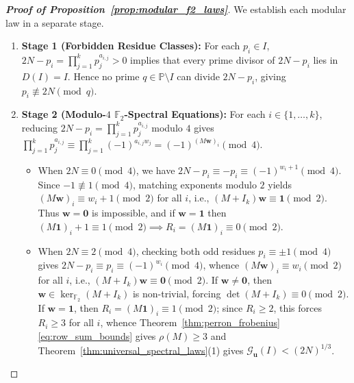 \documentclass[11pt,a4paper]{article}
\theoremstyle{definition}
\begin{document}
\begin{proof}[\textbf{Proof of Proposition~\ref{prop:modular_f2_laws}}]
We establish each modular law in a separate stage.
\begin{enumerate}
    \item \textbf{Stage 1 (Forbidden Residue Classes):} For each $p_i \in I$, $2N - p_i = \prod_{j=1}^k p_j^{a_{i,j}} > 0$ implies that every prime divisor of $2N - p_i$ lies in $D(I) = I$. Hence no prime $q \in \mathbb{P} \setminus I$ can divide $2N - p_i$, giving $p_i \not\equiv 2N \pmod q$.

    \item \textbf{Stage 2 (Modulo-$4$ $\mathbb{F}_2$-Spectral Equations):} For each $i \in \{1, \dots, k\}$, reducing $2N - p_i = \prod_{j=1}^k p_j^{a_{i,j}}$ modulo $4$ gives $\prod_{j=1}^k p_j^{a_{i,j}} \equiv \prod_{j=1}^k (-1)^{a_{i,j} w_j} = (-1)^{(M\mathbf{w})_i} \pmod 4$.
    \begin{itemize}
        \item When $2N \equiv 0 \pmod 4$, we have $2N - p_i \equiv -p_i \equiv (-1)^{w_i + 1} \pmod 4$. Since $-1 \not\equiv 1 \pmod 4$, matching exponents modulo $2$ yields $(M\mathbf{w})_i \equiv w_i + 1 \pmod 2$ for all $i$, i.e., $(M + I_k)\mathbf{w} \equiv \mathbf{1} \pmod 2$. Thus $\mathbf{w} = \mathbf{0}$ is impossible, and if $\mathbf{w} = \mathbf{1}$ then $(M\mathbf{1})_i + 1 \equiv 1 \pmod 2 \implies R_i = (M\mathbf{1})_i \equiv 0 \pmod 2$.
        \item When $2N \equiv 2 \pmod 4$, checking both odd residues $p_i \equiv \pm 1 \pmod 4$ gives $2N - p_i \equiv p_i \equiv (-1)^{w_i} \pmod 4$, whence $(M\mathbf{w})_i \equiv w_i \pmod 2$ for all $i$, i.e., $(M + I_k)\mathbf{w} \equiv \mathbf{0} \pmod 2$. If $\mathbf{w} \neq \mathbf{0}$, then $\mathbf{w} \in \ker_{\mathbb{F}_2}(M + I_k)$ is non-trivial, forcing $\det(M + I_k) \equiv 0 \pmod 2$. If $\mathbf{w} = \mathbf{1}$, then $R_i = (M\mathbf{1})_i \equiv 1 \pmod 2$; since $R_i \ge 2$, this forces $R_i \ge 3$ for all $i$, whence Theorem~\ref{thm:perron_frobenius} \eqref{eq:row_sum_bounds} gives $\rho(M) \ge 3$ and Theorem~\ref{thm:universal_spectral_laws}(1) gives $\mathcal{G}_{\mathbf{u}}(I) < (2N)^{1/3}$.
    \end{itemize}


\end{enumerate}
\end{proof}
\end{document}

